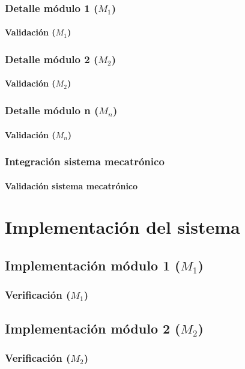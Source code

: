 \documentclass[12pt]{article}
\begin{document}
\subsubsection{Detalle módulo 1 ($M_1$)}
\paragraph{Validación ($M_1$)}
\subsubsection{Detalle módulo 2 ($M_2$)}
\paragraph{Validación ($M_2$)}
\subsubsection{Detalle módulo n ($M_n$)}
\paragraph{Validación ($M_n$)}
\subsubsection{Integración sistema mecatrónico}
\paragraph{Validación sistema mecatrónico}


\section{Implementación del sistema}
\subsection{Implementación módulo 1 ($M_1$)}
\subsubsection{Verificación ($M_1$)}

\subsection{Implementación módulo 2 ($M_2$)}
\subsubsection{Verificación ($M_2$)}
\end{document}

